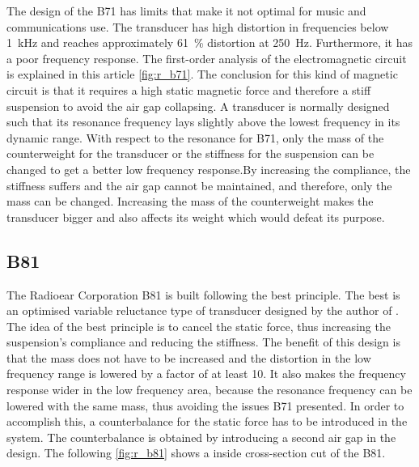 The design of the B71 has limits that make it not optimal for music and communications use. The transducer has high distortion in frequencies below \SI{1}{\kilo\hertz} and reaches approximately \SI{61}{\percent} distortion at \SI{250}{\hertz}. Furthermore, it has a poor frequency response. The first-order analysis of the electromagnetic circuit is explained in this article \autoref{fig:r_b71}. The conclusion for this kind of magnetic circuit is that it requires a high static magnetic force and therefore a stiff suspension to avoid the air gap collapsing. A transducer is normally designed such that its resonance frequency lays slightly above the lowest frequency in its dynamic range. With respect to the resonance for B71, only the mass of the counterweight for the transducer or the stiffness for the suspension can be changed to get a better low frequency response.By increasing the compliance, the stiffness suffers and the air gap cannot be maintained, and therefore, only the mass can be changed. Increasing the mass of the counterweight makes the transducer bigger and also affects its weight which would defeat its purpose. 





\subsection{B81}
The Radioear Corporation B81 is built following the \gls{best} principle. The \gls{best} is an optimised variable reluctance type of transducer designed by the author of \citep{the_balanced_2003}. The idea of the \gls{best} principle is to cancel the static force, thus increasing the suspension's compliance and reducing the stiffness. The benefit of this design is that the mass does not have to be increased and the distortion in the low frequency range is lowered by a factor of at least 10. It also makes the frequency response wider in the low frequency area, because the resonance frequency can be lowered with the same mass, thus avoiding the issues B71 presented. In order to accomplish this, a counterbalance for the static force has to be introduced in the system. The counterbalance is obtained by introducing a second air gap in the design. The following \autoref{fig:r_b81} shows a inside cross-section cut of the B81.


